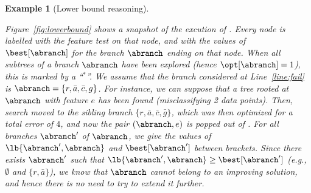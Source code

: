 \documentclass{article}
\newtheorem{example}{Example}
\begin{document}
\begin{example}[Lower bound reasoning]
	\label{ex:lb}


	Figure~\ref{fig:lowerbound} shows a snapshot of the excution of \budalg. Every node is labelled with the feature test on that node, and with the values of $\best[\abranch]$ for the branch $\abranch$ ending on that node. When all subtrees of a branch $\abranch$ have been explored (hence $\opt[\abranch]=1$), this is marked by a ``$^*$''. We assume that the branch considered at Line~\ref{line:fail} is $\abranch = \{r, \bar{a}, \bar{c}, g\}$. For instance, we can suppose that a tree rooted at $\abranch$ with feature $e$ has been found (misclassifying 2 data points). Then, search moved to the sibling branch $\{r, \bar{a}, \bar{c}, \bar{g}\}$, which was then optimized for a total error of $4$, and now the pair $(\abranch,e)$ is popped out of \sequence. For all branches $\abranch'$ of $\abranch$, we give the values of $\lb{\abranch',\abranch}$ and $\best[\abranch']$ between brackets. Since there exists $\abranch'$ such that $\lb{\abranch',\abranch} \geq \best[\abranch']$ (e.g., $\emptyset$ and $\{r, \bar{a}\}$), we know that $\abranch$ cannot belong to an improving solution, and hence there is no need to try to extend it further.




\end{example}
\end{document}
